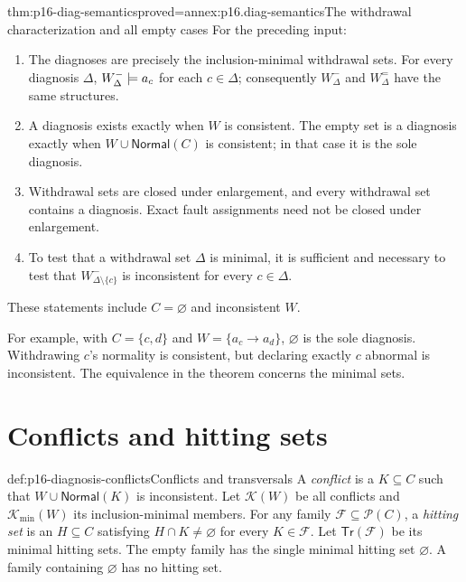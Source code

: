 \begin{hbtheorem}{thm:p16-diag-semantics}{proved=annex:p16.diag-semantics}{The withdrawal characterization and all empty cases}
For the preceding input:
\begin{enumerate}
\item The diagnoses are precisely the inclusion-minimal withdrawal
      sets. For every diagnosis \(\Delta\),
      \(W^-_\Delta\models a_c\) for each \(c\in\Delta\);
      consequently \(W^-_\Delta\) and \(W^=_\Delta\) have the
      same structures.
\item A diagnosis exists exactly when \(W\) is consistent.
      The empty set is a diagnosis exactly when
      \(W\cup\mathsf{Normal}(C)\) is consistent; in that case
      it is the sole diagnosis.
\item Withdrawal sets are closed under enlargement, and every
      withdrawal set contains a diagnosis. Exact fault assignments
      need not be closed under enlargement.
\item To test that a withdrawal set \(\Delta\) is minimal, it is
      sufficient and necessary to test that
      \(W^-_{\Delta\setminus\{c\}}\) is inconsistent for every
      \(c\in\Delta\).
\end{enumerate}
These statements include \(C=\varnothing\) and inconsistent \(W\).
\end{hbtheorem}

For example, with \(C=\{c,d\}\) and \(W=\{a_c\to a_d\}\),
\(\varnothing\) is the sole diagnosis. Withdrawing \(c\)'s normality
is consistent, but declaring exactly \(c\) abnormal is inconsistent.
The equivalence in the theorem concerns the minimal sets.

\section{Conflicts and hitting sets}
\label{sec:p16-diagnosis-conflicts}

\begin{hbdefinition}{def:p16-diagnosis-conflicts}{Conflicts and transversals}
A \emph{conflict} is a \(K\subseteq C\) such that
\(W\cup\mathsf{Normal}(K)\) is inconsistent. Let
\(\mathcal K(W)\) be all conflicts and
\(\mathcal K_{\min}(W)\) its inclusion-minimal members.
For any family \(\mathcal F\subseteq\mathcal P(C)\), a
\emph{hitting set} is an \(H\subseteq C\) satisfying
\(H\cap K\ne\varnothing\) for every \(K\in\mathcal F\).
Let \(\mathsf{Tr}(\mathcal F)\) be its minimal hitting sets.
The empty family has the single minimal hitting set \(\varnothing\).
A family containing \(\varnothing\) has no hitting set.
\end{hbdefinition}


